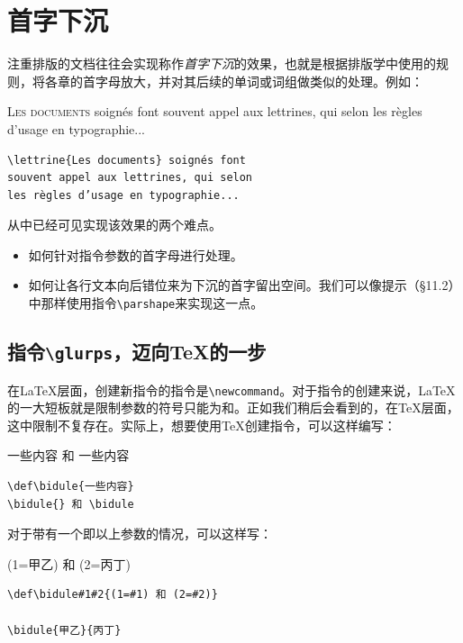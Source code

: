 \section{首字下沉}

注重排版的文档往往会实现称作\emph{首字下沉}的效果，也就是根据排版学中使用的规则，将各章的首字母放大，并对其后续的单词或词组做类似的处理。例如：

\begin{codelist}[11.16]{
\lettrine{L}{es documents} soignés font
souvent appel aux lettrines, qui selon
les règles d’usage en typographie...
}\begin{verbatim}
\lettrine{Les documents} soignés font
souvent appel aux lettrines, qui selon
les règles d’usage en typographie...
\end{verbatim}
\end{codelist}

从中已经可见实现该效果的两个难点。

\begin{itemize}
    \item 如何针对指令参数的首字母进行处理。
    \item 如何让各行文本向后错位来为下沉的首字留出空间。我们可以像提示（\S 11.2）中那样使用指令\verb|\parshape|来实现这一点。
\end{itemize}

\subsection{指令\texttt{\backslash glurps}，迈向\TeX 的一步}

在\LaTeX 层面，创建新指令的指令是\verb|\newcommand|。对于指令的创建来说，\LaTeX 的一大短板就是限制参数的符号只能为\dm{\{}和\dm{\}}。正如我们稍后会看到的，在\TeX 层面，这中限制不复存在。实际上，想要使用\TeX 创建指令，可以这样编写：

\begin{codelist}[11.17]{
\def\bidule{一些内容}
\bidule{} 和 \bidule
}\begin{verbatim}
\def\bidule{一些内容}
\bidule{} 和 \bidule
\end{verbatim}
\end{codelist}

对于带有一个即以上参数的情况，可以这样写：

\begin{codelist}[11.18]{
    \def\bidule#1#2{(1=#1) 和 (2=#2)}

    \bidule{甲乙}{丙丁}
}\begin{verbatim}
\def\bidule#1#2{(1=#1) 和 (2=#2)}

\bidule{甲乙}{丙丁}
\end{verbatim}
\end{codelist}

